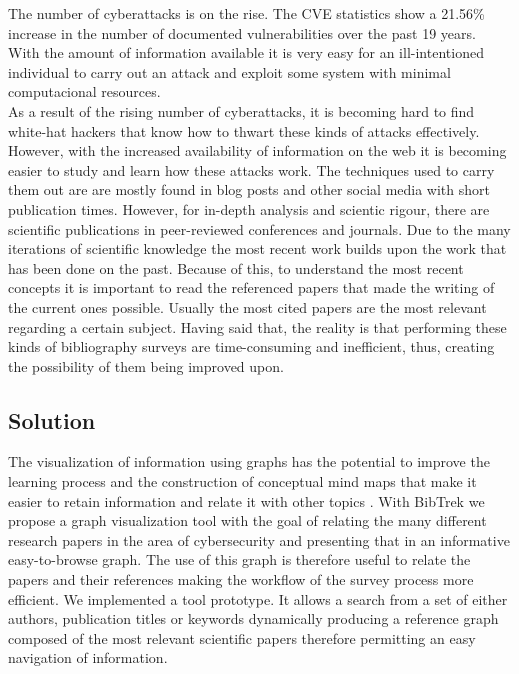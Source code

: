 \documentclass[twocolumn]{article}
\begin{document}
The number of cyberattacks is on the rise. The CVE statistics \cite{cvestatisticsbyyear} show a 21.56\% increase in the number of documented vulnerabilities over the past 19 years. With the amount of information available it is very easy for an ill-intentioned individual to carry out an attack and exploit some system with minimal computacional resources. 
\\[1\baselineskip]
As a result of the rising number of cyberattacks, it is becoming hard to find white-hat hackers that know how to thwart these kinds of attacks effectively. However, with the increased availability of information on the web it is becoming easier to study and learn how these attacks work. The techniques used to carry them out are are mostly found in blog posts and other social media with short publication times. However, for in-depth analysis and scientic rigour, there are scientific publications in peer-reviewed conferences and journals. Due to the many iterations of scientific knowledge the most recent work builds upon the work that has been done on the past. Because of this, to understand the most recent concepts it is important to read the referenced papers that made the writing of the current ones possible. Usually the most cited papers are the most relevant regarding a certain subject. Having said that, the reality is that performing these kinds of bibliography surveys are time-consuming and inefficient, thus, creating the possibility of them being improved upon.

\subsection{Solution}
The visualization of information using graphs has the potential to improve the learning process and the construction of conceptual mind maps that make it easier to retain information and relate it with other topics \cite{enhancinglearningwithvisualizationtechniques}. With BibTrek we propose a graph visualization tool with the goal of relating the many different research papers in the area of cybersecurity and presenting that in an informative easy-to-browse graph. The use of this graph is therefore useful to relate the papers and their references making the workflow of the survey process more efficient. We implemented a tool prototype. It allows a search from a set of either authors, publication titles or keywords dynamically producing a reference graph composed of the most relevant scientific papers therefore permitting an easy navigation of information. 
\end{document}
